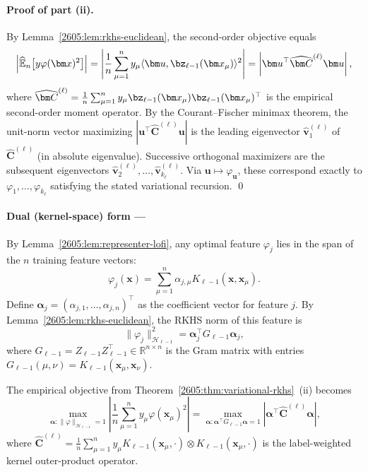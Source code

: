 \paragraph{Proof of part (ii).}

By Lemma~\ref{2605:lem:rkhs-euclidean}, the second-order objective equals
\[
    \left|\widehat{\mathbb E}_n\bigl[y \varphi(\bm x)^2\bigr]\right|
    =
    \left|\frac{1}{n}\sum_{\mu=1}^n y_\mu\langle \bm u,\bz_{\ell-1}(\bm x_\mu)\rangle^2\right|
    =
    \left|\bm u^\top \widehat{\bm C}^{(\ell)} \bm u\right|,
\]
where $\widehat{\bm C}^{(\ell)} = \tfrac{1}{n}\sum_{\mu=1}^n y_\mu \bz_{\ell-1}(\bm x_\mu)\bz_{\ell-1}(\bm x_\mu)^\top$ is the empirical second-order moment operator. By the Courant--Fischer minimax theorem, the unit-norm vector maximizing $|\bm u^\top \widehat{\bm C}^{(\ell)}\bm u|$ is the leading eigenvector $\hat{\bm v}^{(\ell)}_1$ of $\widehat{\bm C}^{(\ell)}$ (in absolute eigenvalue). Successive orthogonal maximizers are the subsequent eigenvectors $\hat{\bm v}^{(\ell)}_2,\dots,\hat{\bm v}^{(\ell)}_{k_\ell}$. Via $\bm u\mapsto\varphi_{\bm u}$, these correspond exactly to $\varphi_1,\dots,\varphi_{k_\ell}$ satisfying the stated variational recursion. \qed

\paragraph{Dual (kernel-space) form ---}

By Lemma~\ref{2605:lem:representer-lofi}, any optimal feature $\varphi_j$ lies in the span of the $n$ training feature vectors:
\begin{equation}
\varphi_j(\bm x) = \sum_{\mu=1}^n \alpha_{j,\mu} K_{\ell-1}(\bm x, \bm x_\mu).
\end{equation}
Define $\bm\alpha_j = (\alpha_{j,1}, \dots, \alpha_{j,n})^\top$ as the coefficient vector for feature $j$. By Lemma~\ref{2605:lem:rkhs-euclidean}, the RKHS norm of this feature is
\begin{equation}
\|\varphi_j\|^2_{\mathcal H_{\ell-1}} = \bm\alpha_j^\top G_{\ell-1} \bm\alpha_j,
\end{equation}
where $G_{\ell-1} = Z_{\ell-1}Z_{\ell-1}^\top \in \mathbb R^{n \times n}$ is the Gram matrix with entries $G_{\ell-1}(\mu, \nu) = K_{\ell-1}(\bm x_\mu, \bm x_\nu)$.

The empirical objective from Theorem~\ref{2605:thm:variational-rkhs}~(ii) becomes
\begin{equation}
\max_{\bm\alpha:\|\varphi\|_{\mathcal H_{\ell-1}}=1} \left|\frac{1}{n}\sum_{\mu=1}^n y_\mu \varphi(\bm x_\mu)^2\right| = \max_{\bm\alpha:\bm\alpha^\top G_{\ell-1}\bm\alpha=1} \left|\bm\alpha^\top \widehat{\bm C}^{(\ell)} \bm\alpha\right|,
\end{equation}
where $\widehat{\bm C}^{(\ell)} = \frac{1}{n}\sum_{\mu=1}^n y_\mu K_{\ell-1}(\bm x_\mu, \cdot) \otimes K_{\ell-1}(\bm x_\mu, \cdot)$ is the label-weighted kernel outer-product operator.


